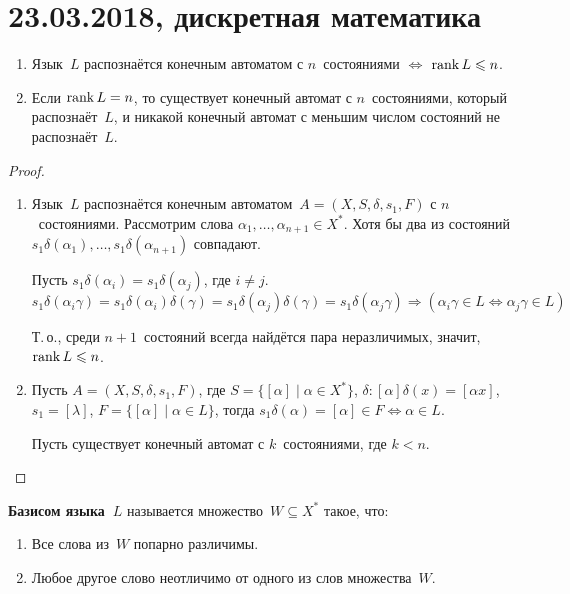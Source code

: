 \chapter{23.03.2018, дискретная математика}
\begin{theorem}
\begin{enumerate}
	\item Язык~$L$ распознаётся конечным автоматом с $n$~состояниями $\Leftrightarrow$ $\operatorname{rank} L \leqslant n$.
	\item Если $\operatorname{rank} L = n$, то существует конечный автомат с $n$~состояниями, который распознаёт~$L$, и никакой конечный автомат с меньшим числом состояний не распознаёт~$L$.
\end{enumerate}
\end{theorem}
\begin{proof}
\begin{enumerate}
	\item Язык~$L$ распознаётся конечным автоматом~$A = (X, S, \delta, s_1, F)$ с $n$~состояниями.
	Рассмотрим слова $\alpha_1, \ldots, \alpha_{n+1} \in X^*$.
	Хотя бы два из состояний $s_1 \delta(\alpha_1), \ldots, s_1 \delta(\alpha_{n+1})$ совпадают.
	
	Пусть $s_1 \delta(\alpha_i) = s_1 \delta(\alpha_j)$, где $i \neq j$.
	\begin{equation*}
	s_1 \delta(\alpha_i \gamma) =
	s_1 \delta(\alpha_i) \delta(\gamma) =
	s_1 \delta(\alpha_j) \delta(\gamma) =
	s_1 \delta(\alpha_j \gamma) \Rightarrow
	(\alpha_i \gamma \in L \Leftrightarrow \alpha_j \gamma \in L)
	\end{equation*}
	
	Т.\,о., среди $n + 1$~состояний всегда найдётся пара неразличимых, значит, $\operatorname{rank} L \leqslant n$.
	
	\item Пусть $A = (X, S, \delta, s_1, F)$, где $S = \{ [\alpha] \mid \alpha \in X^* \}$, $\delta \colon [\alpha] \delta(x) = [\alpha x]$, $s_1 = [\lambda]$, $F = \{ [\alpha] \mid \alpha \in L \}$,
	тогда $s_1 \delta(\alpha) = [\alpha] \in F \Leftrightarrow \alpha \in L$.
	
	Пусть существует конечный автомат с $k$~состояниями, где $k < n$.
\end{enumerate}
\end{proof}

\textbf{Базисом языка~$L$} называется множество~$W \subseteq X^*$ такое, что:
\begin{enumerate}
	\item Все слова из~$W$ попарно различимы.
	\item Любое другое слово неотличимо от одного из слов множества~$W$.
\end{enumerate}

